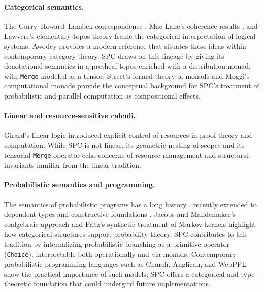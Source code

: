 \documentclass{article}
\begin{document}
\paragraph{Categorical semantics.}
The Curry–Howard–Lambek correspondence \cite{lambek1986categorical}, Mac Lane’s
coherence results \cite{maclane1963natural}, and Lawvere’s elementary topos
theory \cite{lawvere1970quantifiers} frame the categorical interpretation of
logical systems. Awodey \cite{awodey2010category} provides a modern reference
that situates these ideas within contemporary category theory. SPC draws on this
lineage by giving its denotational semantics in a presheaf topos enriched with a
distribution monad, with \texttt{Merge} modeled as a tensor. Street’s formal
theory of monads \cite{street1972two} and Moggi’s computational monads
\cite{moggi1991notions} provide the conceptual background for SPC’s treatment of
probabilistic and parallel computation as compositional effects.

\paragraph{Linear and resource-sensitive calculi.}
Girard’s linear logic \cite{girard1987linear} introduced explicit control of
resources in proof theory and computation. While SPC is not linear, its
geometric nesting of scopes and its tensorial \texttt{Merge} operator echo
concerns of resource management and structural invariants familiar from the
linear tradition.

\paragraph{Probabilistic semantics and programming.}
The semantics of probabilistic programs has a long history
\cite{kozen1981semantics,giry1982categorical}, recently extended to dependent
types and constructive foundations \cite{adams2020foundations}. Jacobs and
Mandemaker’s coalgebraic approach \cite{jacobs2015new} and Fritz’s synthetic
treatment of Markov kernels \cite{fritz2020synthetic} highlight how categorical
structures support probability theory. SPC contributes to this tradition by
internalizing probabilistic branching as a primitive operator (\texttt{Choice}),
interpretable both operationally and via monads. Contemporary probabilistic
programming languages such as Church, Anglican, and WebPPL
\cite{goodman2014design,van2018introduction,gordon2014probabilistic} show the
practical importance of such models; SPC offers a categorical and type-theoretic
foundation that could undergird future implementations.
\end{document}
